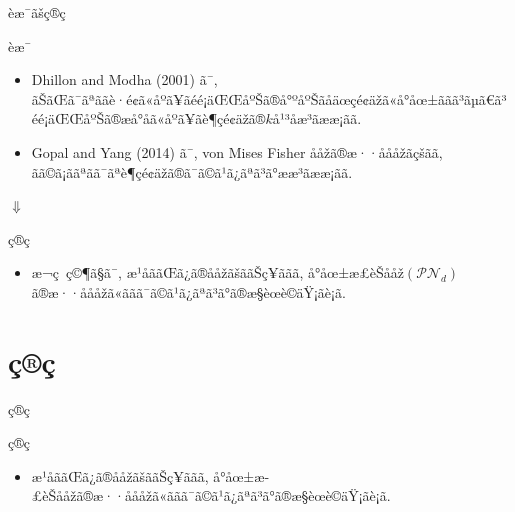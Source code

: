 \documentclass[dvipdfmx]{beamer} %
\begin{document}
\begin{frame}{èæ¯ãšç®ç}

\begin{block}{èæ¯}
\begin{itemize}
\item 
Dhillon and Modha (2001) ã¯, ãŠãŒã¯ãªããè·é¢ã«åºã¥ãéé¡äŒŒåºŠã®å°ºåºŠãåäœçé¢äžã«å°åœ±ããã³ãµã€ã³éé¡äŒŒåºŠã®æå°åã«åºã¥ãè¶çé¢äžã®$k$å¹³åæ³ãææ¡ãã.
\vspace{0.2cm}
\item  
Gopal and Yang (2014) ã¯, von Mises Fisher ååžã®æ··åååžãçšãã, ãã©ã¡ããªãã¯ãªè¶çé¢äžã®ã¯ã©ã¹ã¿ãªã³ã°ææ³ãææ¡ãã.
\end{itemize}
\end{block}

\vspace{0.2cm}
\centering
{\LARGE $\Downarrow$}

\begin{block}{ç®ç}
\begin{itemize}
\item
æ¬ç ç©¶ã§ã¯, æ¹åããŒã¿ã®ååžãšããŠç¥ããã, å°åœ±æ­£èŠååž$(\mathcal{PN}_d)$ã®æ··åååžã«ããã¯ã©ã¹ã¿ãªã³ã°ã®æ§èœè©äŸ¡ãè¡ã.
\end{itemize}
\end{block}
\end{frame}

\section{ç®ç}
\begin{frame}{ç®ç}
\begin{block}{ç®ç}
\begin{itemize}

\item
æ¹åããŒã¿ã®ååžãšããŠç¥ããã, å°åœ±æ­£èŠååžã®æ··åååžã«ããã¯ã©ã¹ã¿ãªã³ã°ã®æ§èœè©äŸ¡ãè¡ã.

\end{itemize}
\end{block}
\end{frame}
\fi
\end{document}
